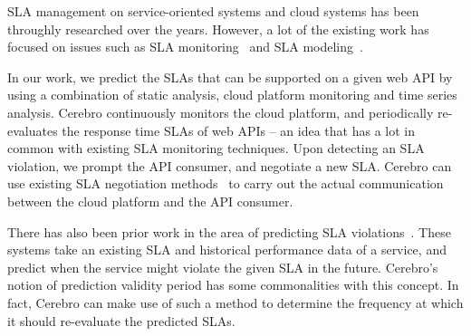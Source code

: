 SLA management on service-oriented systems and cloud systems has been 
throughly researched over the years. However, a lot of the existing work has focused on issues 
such as SLA monitoring~\cite{Michlmayr:2009:CQM:1657755.1657756,Tripathy:2011:MMS:1980822.1980832,Raimondi:2008:EOM:1453101.1453125,Bertolino:2007:SUS:1294904.1294914} and SLA modeling~\cite{Chau:2008:ASM:1463788.1463802,Stamou:2013:SGM:2516588.2516592,Skene:2004:PSL:998675.999422}. 

In our work, we predict the SLAs that can be supported on a given web API by using a combination of
static analysis, cloud platform monitoring and time series analysis. Cerebro continuously monitors the cloud platform,
and periodically re-evaluates the response time SLAs of web APIs -- an idea that has a lot in common with existing SLA
monitoring techniques. Upon detecting an SLA violation, we prompt the API consumer, and negotiate a new
SLA. Cerebro can use existing SLA negotiation methods~\cite{Mahbub:2011:PSN:2061042.2062022,Yaqub:2014:ONS:2680847.2681496,6546098} to carry out the actual communication between the cloud platform and the API consumer. 

There has also been prior work in the area of predicting 
SLA violations~\cite{Leitner10,6976585,Duan:2006:PIP:1142473.1142582}. 
These systems take an existing SLA and historical performance data of a service, and predict when the 
service might violate the given SLA in the future. 
Cerebro's notion of prediction validity period has some commonalities with this concept. In fact, Cerebro
can make use of such a method to determine the frequency at which it should re-evaluate the predicted
SLAs.